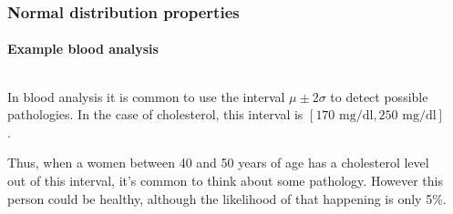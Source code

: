 \begin{frame}
\frametitle{Normal distribution properties}
\framesubtitle{Example blood analysis}
\begin{columns}
\begin{column}{0.47\textwidth}
In blood analysis it is common to use the interval $\mu\pm 2\sigma$ to detect possible pathologies.
In the case of cholesterol, this interval is $[170\text{ mg/dl}, 250\text{ mg/dl}]$. 

Thus, when a women between 40 and 50 years of age has a cholesterol level out of this interval, it's common to think about some pathology. However this person could be healthy, although the likelihood of that happening is only 5\%.
\end{column}
\begin{column}{0.47\textwidth}
\begin{center}
\end{center}
\end{column}
\end{columns}
\end{frame}


